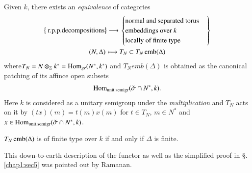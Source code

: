 \begin{theorem}\label{chap1:thm4.1} %
Given $k$, there exists an \textit{equivalence} of categories
\begin{gather*}
\big\{\text{ r.p.p.decompositions} \big\} \longrightarrow 
\left.
\begin{cases}
\text{normal and separated torus} \\
\text{embeddings over $k$} \\
\text{locally of finite type} 
\end{cases} 
\right\}\\
(N, \Delta) \longmapsto T_N\subset T_N \operatorname{emb} (\Delta)
\end{gather*}
where\pageoriginale $T_N = N \otimes_{\mathbb{Z}} k^* = \operatorname{Hom}_{gr}
(N^*, k^*) $ and $T_N emb (\Delta)$ is obtained as the canonical
patching of its affince open subsets   
$$
\operatorname{Hom}_{\text{unit.semigr}} (\check{\sigma} \cap N^*, k).  
$$
Here $k$ is considered as a unitary semigroup under the \textit{
  multiplication} and $T_N$ acts on it by $(tx)(m) = t(m)x(m)$ for $t
\in T_N$, $m \in N^*$ and $x \in
\operatorname{Hom}_{\text{unit.semigr}}(\check{\sigma}\cap N^*, k)$.

 $T_N \operatorname{emb}(\Delta)$ is of finite type over $k$ if and only if $\Delta$
is finite.   
\end{theorem}

\begin{remark*}
This down-to-earth description of the functor as well as the
simplified proof in \S. \ref{chap1:sec5} was pointed out by Ramanan.  
\end{remark*}

